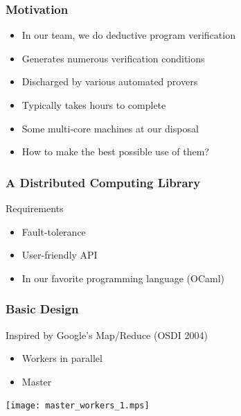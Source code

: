 \documentclass[xcolor=dvipsnames]{beamer}
\let\emph\alert
\begin{document}

\begin{frame}\frametitle{Motivation}
  \begin{itemize}
  \item In our team, we do deductive program verification
  \item Generates numerous verification conditions
  \item Discharged by various automated provers
  \item Typically takes \emph{hours} to complete
  \end{itemize}
  \vspace{1cm}
  \begin{itemize}
  \item Some multi-core machines at our disposal
  \item How to make the best possible use of them?
  \end{itemize}
\end{frame}


\begin{frame}\frametitle {A Distributed Computing Library}
  Requirements
  \begin{itemize}
  \item Fault-tolerance
  \item User-friendly API
  \item In our favorite programming language (OCaml)
  \end{itemize}
\end{frame}


\begin{frame}\frametitle {Basic Design}

Inspired by Google's Map/Reduce (OSDI 2004)

\begin{itemize}
\item Workers in parallel
\item Master
\end{itemize}

\begin{center}
  \texttt{[image: master\_workers\_1.mps]}  
\end{center}
\end{frame}
\end{document}
